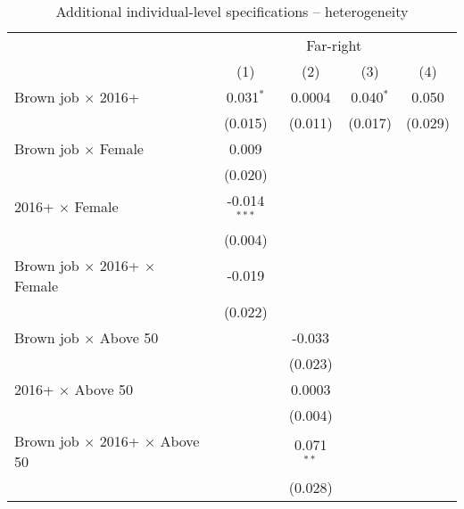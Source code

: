 
\begin{table}[htbp]
   \caption{Additional individual-level specifications – heterogeneity}
   \centering
   \begin{tabular}{lcccc}
      \tabularnewline \midrule \midrule
       & \multicolumn{4}{c}{Far-right}\\
                                                      & (1)            & (2)          & (3)            & (4)\\  
      Brown job $\times$ 2016+                        & 0.031$^{*}$    & 0.0004       & 0.040$^{*}$    & 0.050\\   
                                                      & (0.015)        & (0.011)      & (0.017)        & (0.029)\\   
      Brown job $\times$ Female                       & 0.009          &              &                &   \\   
                                                      & (0.020)        &              &                &   \\   
      2016+ $\times$ Female                           & -0.014$^{***}$ &              &                &   \\   
                                                      & (0.004)        &              &                &   \\   
      Brown job $\times$ 2016+ $\times$ Female        & -0.019         &              &                &   \\   
                                                      & (0.022)        &              &                &   \\   
      Brown job $\times$ Above 50                     &                & -0.033       &                &   \\   
                                                      &                & (0.023)      &                &   \\   
      2016+ $\times$ Above 50                         &                & 0.0003       &                &   \\   
                                                      &                & (0.004)      &                &   \\   
      Brown job $\times$ 2016+ $\times$ Above 50      &                & 0.071$^{**}$ &                &   \\   
                                                      &                & (0.028)      &                &   \\   

\end{tabular}
\end{table}
